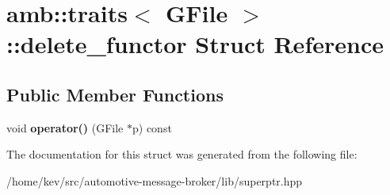 \hypertarget{structamb_1_1traits_3_01GFile_01_4_1_1delete__functor}{\section{amb\+:\+:traits$<$ G\+File $>$\+:\+:delete\+\_\+functor Struct Reference}
\label{structamb_1_1traits_3_01GFile_01_4_1_1delete__functor}
}
\subsection*{Public Member Functions}
\begin{DoxyCompactItemize}
\item 
\hypertarget{structamb_1_1traits_3_01GFile_01_4_1_1delete__functor_ad67dcef3edee3a6fb2e54f9bf1d3fde5}{void {\bfseries operator()} (G\+File $\ast$p) const }\label{structamb_1_1traits_3_01GFile_01_4_1_1delete__functor_ad67dcef3edee3a6fb2e54f9bf1d3fde5}

\end{DoxyCompactItemize}


The documentation for this struct was generated from the following file\+:\begin{DoxyCompactItemize}
\item 
/home/kev/src/automotive-\/message-\/broker/lib/superptr.\+hpp\end{DoxyCompactItemize}
